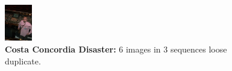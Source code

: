 \documentclass{acm_proc_article-sp}
\newcommand{\thumbheight}{16mm}
\newenvironment{thumbsequence}{}{\makebox[4mm]{}}
\begin{document}
\begin{figure}
\begin{centering}
\begin{thumbsequence}
		\includegraphics[height=\thumbheight]{resources/concordia/looseduplicate6.jpg}
	\end{thumbsequence}
	\caption{\textbf{Costa Concordia Disaster:} 6 images in 3 sequences loose duplicate.}
	\label{fig:concordia}
\end{centering}
\end{figure}
\end{document}

